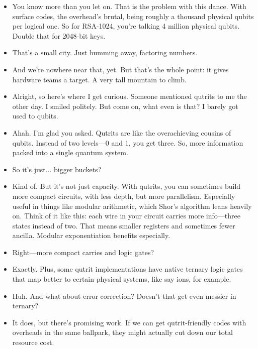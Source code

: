 \begin{itemize}[leftmargin=1.5cm]
  \item[Nina:] You know more than you let on. That is the problem with this dance. With surface codes, the overhead’s brutal, being roughly a thousand physical qubits per logical one. So for RSA-1024, you’re talking 4 million physical qubits. Double that for 2048-bit keys.

  \item[Eleanor:] That’s a small city. Just humming away, factoring numbers.

  \item[Nina:] And we’re nowhere near that, yet. But that’s the whole point: it gives hardware teams a target. A very tall mountain to climb.

  \item[Eleanor:] Alright, so here’s where I get curious. Someone mentioned qutrits to me the other day. I smiled politely. But come on, what even is that? I barely got used to qubits.

  \item[Nina:] Ahah. I’m glad you asked. Qutrits are like the overachieving cousins of qubits. Instead of two levels—0 and 1, you get three. So, more information packed into a single quantum system.

  \item[Eleanor:] So it’s just... bigger buckets?

  \item[Nina:] Kind of. But it’s not just capacity. With qutrits, you can sometimes build more compact circuits, with less depth, but more parallelism. Especially useful in things like modular arithmetic, which Shor’s algorithm leans heavily on. Think of it like this: each wire in your circuit carries more info—three states instead of two. That means smaller registers and sometimes fewer ancilla. Modular exponentiation benefits especially.

  \item[Eleanor:] Right—more compact carries and logic gates?

  \item[Nina:] Exactly. Plus, some qutrit implementations have native ternary logic gates that map better to certain physical systems, like say ions, for example.

  \item[Eleanor:] Huh. And what about error correction? Doesn’t that get even messier in ternary?

  \item[Nina:] It does, but there’s promising work. If we can get qutrit-friendly codes with overheads in the same ballpark, they might actually cut down our total resource cost.


\end{itemize}
